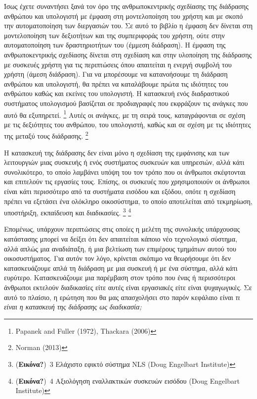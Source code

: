 \documentclass[
]{article}
\begin{document}
Ίσως έχετε συναντήσει ξανά τον όρο της ανθρωποκεντρικής σχεδίασης της
διάδρασης ανθρώπου και υπολογιστή με έμφαση στη μοντελοποίηση του χρήστη
και με σκοπό την αυτοματοποίηση των διεργασιών του. Σε αυτό το βιβλίο η
έμφαση δεν δίνεται στη μοντελοποίηση των δεξιοτήτων και της συμπεριφοράς
του χρήστη, ούτε στην αυτοματοποίηση των δραστηριοτήτων του (έμμεση
διάδραση). Η έμφαση της ανθρωποκεντρικής σχεδίασης δίνεται στη σχεδίαση
και στην υλοποίηση της διάδρασης με συσκευές χρήστη για τις περιπτώσεις
όπου απαιτείται η ενεργή συμβολή του χρήστη (άμεση διάδραση). Για να
μπορέσουμε να κατανοήσουμε τη διάδραση ανθρώπου και υπολογιστή, θα
πρέπει να καταλάβουμε πρώτα τις ιδιότητες του ανθρώπου καθώς και εκείνες
του υπολογιστή. Η κατασκευή ενός διαδραστικού συστήματος υπολογισμού
βασίζεται σε προδιαγραφές που εκφράζουν τις ανάγκες που αυτό θα
εξυπηρετεί. \footnote{Papanek and Fuller (1972), Thackara (2006)} Αυτές
οι ανάγκες, με τη σειρά τους, καταγράφονται σε σχέση με τις δεξιότητες
του ανθρώπου, του υπολογιστή, καθώς και σε σχέση με τις ιδιότητες της
μεταξύ τους διάδρασης. \footnote{Norman (2013)}

Η κατασκευή της διάδρασης δεν είναι μόνο η σχεδίαση της εμφάνισης και
των λειτουργιών μιας συσκευής ή ενός συστήματος συσκευών και υπηρεσιών,
αλλά κάτι συνολικότερο, το οποίο λαμβάνει υπόψη του τον τρόπο που οι
άνθρωποι σκέφτονται και επιτελούν τις εργασίες τους. Επίσης, οι συσκευές
που χρησιμοποιούν οι άνθρωποι είναι κάτι περισσότερο από τα συστήματα
εισόδου και εξόδου, οπότε η σχεδίαση πρέπει να εξετάσει ένα ολόκληρο
οικοσύστημα, το οποίο αποτελείται από τεκμηρίωση, υποστήριξη, εκπαίδευση
και διαδικασίες. \footnote{(\textbf{Εικόνα?})~3 Ελάχιστο εφικτό σύστημα
  NLS (Doug Engelbart Institute)} \footnote{(\textbf{Εικόνα?})~4
  Αξιολόγηση εναλλακτικών συσκευών εισόδου (Doug Engelbart Institute)}

Επομένως, υπάρχουν περιπτώσεις στις οποίες η μελέτη της συνολικής
υπάρχουσας κατάστασης μπορεί να δείξει ότι δεν απαιτείται κάποιο νέο
τεχνολογικό σύστημα, αλλά απλώς μια αναδιάταξη, ή μια βελτίωση των
επιμέρους τμημάτων αυτού του οικοσυστήματος. Για αυτόν τον λόγο,
κρίνεται σκόπιμο να θεωρήσουμε ότι δεν κατασκευάζουμε απλά τη διάδραση
με μια συσκευή ή με ένα σύστημα, αλλά κάτι ευρύτερο. Κατασκευάζουμε μια
παρέμβαση στον τρόπο που ένας ή περισσότεροι άνθρωποι εκτελούν
διαδικασίες είτε αυτές είναι εργασιακές είτε είναι ψυχαγωγικές. Σε αυτό
το πλαίσιο, η ερώτηση που θα μας απασχολήσει στο παρόν κεφάλαιο είναι
\emph{τι είναι η κατασκευή της διάδρασης ως διαδικασία;}
\end{document}

